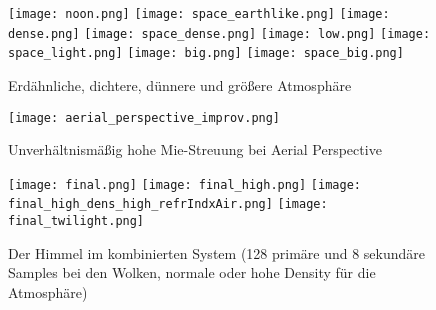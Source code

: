 \onecolumn

\begin{figure}

\centering
\texttt{[image: noon.png]} \texttt{[image: space\_earthlike.png]}
\texttt{[image: dense.png]} \texttt{[image: space\_dense.png]}
\texttt{[image: low.png]} \texttt{[image: space\_light.png]}
\texttt{[image: big.png]} \texttt{[image: space\_big.png]}

\centering
\caption{Erdähnliche, dichtere, dünnere und größere Atmosphäre}
\label{pics}
\end{figure}

\begin{figure}
\centering
\texttt{[image: aerial\_perspective\_improv.png]}
\caption{Unverhältnismäßig hohe Mie-Streuung bei Aerial Perspective}
\label{ap_fail}
\end{figure}

\begin{figure}
\centering
\texttt{[image: final.png]}
\texttt{[image: final\_high.png]}
\texttt{[image: final\_high\_dens\_high\_refrIndxAir.png]}
\texttt{[image: final\_twilight.png]}
\caption{Der Himmel im kombinierten System (128 primäre und 8 sekundäre Samples bei den Wolken, normale oder hohe Density
für die Atmosphäre)}
\label{final}
\end{figure}
